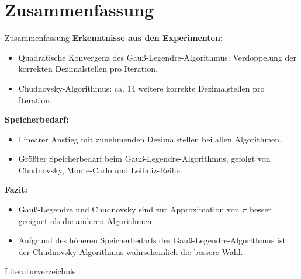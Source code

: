\documentclass[9pt, t]{beamer}
\begin{document}
\section{Zusammenfassung}

\begin{frame}{Zusammenfassung}
    \textbf{Erkenntnisse aus den Experimenten:}

    \begin{itemize}
        \item Quadratische Konvergenz des Gauß-Legendre-Algorithmus:
              Verdoppelung der korrekten Dezimalstellen pro Iteration.
        \item Chudnovsky-Algorithmus: ca. 14 weitere korrekte Dezimalstellen
              pro Iteration.
    \end{itemize}

    \textbf{Speicherbedarf:}
    \begin{itemize}
        \item Linearer Anstieg mit zunehmenden Dezimalstellen bei allen
              Algorithmen.
        \item Größter Speicherbedarf beim Gauß-Legendre-Algorithmus, gefolgt
              von Chudnovsky, Monte-Carlo und Leibniz-Reihe.
    \end{itemize}

    \textbf{Fazit:}
    \begin{itemize}
        \item Gauß-Legendre und Chudnovsky sind zur Approximation von \(\pi\)
              besser geeignet als die anderen Algorithmen.
        \item Aufgrund des höheren Speicherbedarfs des
              Gauß-Legendre-Algorithmus ist der Chudnovsky-Algorithmus
              wahrscheinlich die bessere Wahl.
    \end{itemize}
\end{frame}

\begin{frame}{Literaturverzeichnis}
    \printbibliography
\end{frame}
\end{document}
